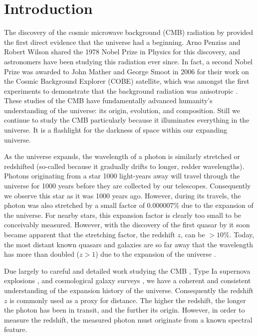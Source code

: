 \chapter{Introduction}

\begin{bibunit}

The discovery of the cosmic microwave background (CMB) radiation by \citet{1965ApJ...142..419P}
provided the first direct evidence that the universe had a beginning. Arno Penzias and Robert Wilson
shared the 1978 Nobel Prize in Physics for this discovery, and astronomers have been studying this
radiation ever since. In fact, a second Nobel Prize was awarded to John Mather and George Smoot in
2006 for their work on the Cosmic Background Explorer (COBE) satellite, which was amongst the first
experiments to demonstrate that the background radiation was anisotropic
\citep{1992ApJ...396L...1S}. These studies of the CMB have fundamentally advanced humanity's
understanding of the universe: its origin, evolution, and composition. Still we continue to study
the CMB particularly because it illuminates everything in the universe. It is a flashlight for the
darkness of space within our expanding universe.

As the universe expands, the wavelength of a photon is similarly stretched or redshifted (so-called
because it gradually drifts to longer, redder wavelengths). Photons originating from a star 1000
light-years away will travel through the universe for 1000 years before they are collected by our
telescopes. Consequently we observe this star as it was 1000 years ago. However, during its travels,
the photon was also stretched by a small factor of $0.000007\%$ due to the expansion of the
universe.  For nearby stars, this expansion factor is clearly too small to be conceivably measured.
However, with the discovery of the first quasar by \citet{1963Natur.197.1040S} it soon became
apparent that the stretching factor, the redshift $z$, can be $>10\%$. Today, the most distant known
quasars and galaxies are so far away that the wavelength has more than doubled ($z > 1$) due to the
expansion of the universe \citep{2011Natur.474..616M, 2015ApJ...810L..12Z, 2016ApJ...819..129O,
2018Natur.553..473B}.

Due largely to careful and detailed work studying the CMB \citep[e.g.,][]{2016A&A...594A..25P}, Type
Ia supernova explosions \citep[e.g.,][]{1998AJ....116.1009R,1999ApJ...517..565P}, and cosmological
galaxy surveys \citep[e.g.,][]{2001MNRAS.328.1039C}, we have a coherent and consistent understanding
of the expansion history of the universe. Consequently the redshift $z$ is commonly used as a proxy
for distance. The higher the redshift, the longer the photon has been in transit, and the further
its origin. However, in order to measure the redshift, the measured photon must originate from a
known spectral feature.


\end{bibunit}
